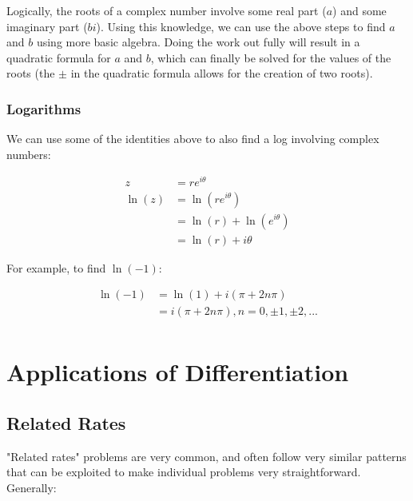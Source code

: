 \documentclass[12pt]{article}
\begin{document}
Logically, the roots of a complex number involve some real part ($a$) and some imaginary part ($bi$). Using this knowledge, we can use the above steps to find $a$ and $b$ using more basic algebra. Doing the work out fully will result in a quadratic formula for $a$ and $b$, which can finally be solved for the values of the roots (the $\pm$ in the quadratic formula allows for the creation of two roots).

\subsubsection{Logarithms}

We can use some of the identities above to also find a log involving complex numbers:

\begin{equation}
    \begin{split}
        z &= re^{i\theta}\\
        \ln(z) &= \ln(re^{i\theta})\\
        &= \ln(r) + \ln(e^{i\theta})\\
        &= \ln(r) + i\theta
    \end{split}
\end{equation}

For example, to find $\ln(-1)$:

\begin{equation}
    \begin{split}
        \ln(-1) &= \ln(1) + i(\pi + 2n\pi)\\
        &= i(\pi + 2n\pi), n = 0, \pm 1, \pm 2, ...\\
    \end{split}
\end{equation}

\section{Applications of Differentiation}
\subsection{Related Rates}

"Related rates" problems are very common, and often follow very similar patterns that can be exploited to make individual problems very straightforward. Generally:
\end{document}
